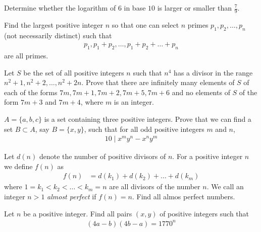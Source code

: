 \documentclass[problems.tex]{subfile}
\begin{document}
	\begin{problem}
		Determine whether the logarithm of $6$ in base $10$ is larger or smaller than $\displaystyle\frac{7}{9}$.
	\end{problem}

	\begin{problem}
		Find the largest positive integer $n$ so that one can select $n$ primes $p_1, p_2, \dots, p_n$ (not necessarily distinct) such that
		\begin{align*}
			p_1, p_1+p_2, \dots, p_1+p_2+\dots+p_n
		\end{align*}
		are all primes.
	\end{problem}

	\begin{problem}
		Let $S$ be the set of all positive integers $n$ such that $n^4$ has a divisor in the range $n^2 +1, n^2 + 2,\dots,n^2 + 2n$. Prove that there are infinitely many elements of $S$ of each of the forms $7m, 7m+1, 7m+2, 7m+5, 7m+6$ and no elements of $S$ of the form $7m+3$ and $7m+4$, where $m$ is an integer. %
	\end{problem}

	\begin{problem}
		$A=\{a,b,c\}$ is a set containing three positive integers. Prove that we can find a set $B \subset A$, say $B=\{x,y\}$, such that for all odd positive integers $m$ and $n$,
		\begin{align*}
			10 \mid x^m y^n - x^n y^m
		\end{align*}
	\end{problem}

	\begin{problem}
		Let $d(n)$ denote the number of positive divisors of $n$. For a positive integer $n$ we define $f(n)$ as
		\begin{align*}
			f(n) & = d(k_1) + d(k_2) + \dots + d(k_m)
		\end{align*}
		where $ 1=k_1 < k_2 < \dots < k_m=n$ are all divisors of the number $n$. We call an integer $n>1$ \textit{almost perfect} if $f(n)=n$. Find all almos perfect numbers.
	\end{problem}

	\begin{problem}
		Let $n$ be a positive integer. Find all pairs $(x,y)$ of positive integers such that
		\begin{align*}
			(4a-b)(4b-a)=1770^n
		\end{align*}
	\end{problem}
\end{document}
